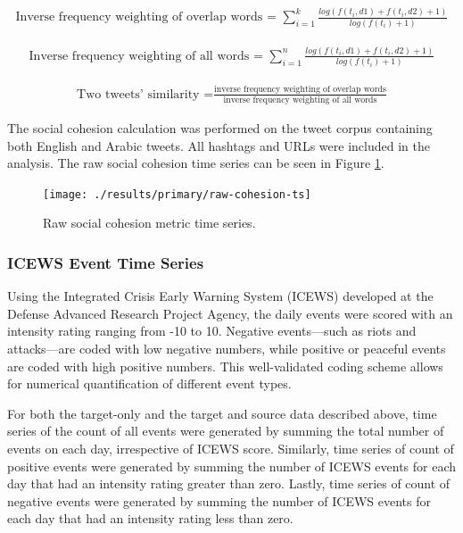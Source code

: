 \documentclass[
  english,
  man]{apa6}
\begin{document}
\begin{align}
\text{Inverse frequency weighting of overlap words = }\sum_{i=1}^k
\frac{log(f(t_i, d1) + f(t_i, d2) + 1)}{log(f(t_i) + 1)}
\end{align}

\begin{align}
\text{Inverse frequency weighting of all words = }\sum_{i=1}^n \frac{log(f(t_i,
d1) + f(t_i, d2) + 1)}{log(f(t_i) + 1)}
\end{align}

\begin{align}
\text{Two tweets' similarity =}\frac{\text{inverse frequency weighting of overlap
words}}{\text{inverse frequency weighting of all words}}
\end{align}

\noindent The social cohesion calculation was performed on the tweet corpus
containing both English and Arabic tweets. All hashtags and URLs were included
in the analysis. The raw social cohesion time series can be seen in Figure
\ref{fig:raw-cohesion-ts}.

\begin{figure}
\texttt{[image: ./results/primary/raw-cohesion-ts]} \caption{Raw social cohesion metric time series.}\label{fig:raw-cohesion-ts}
\end{figure}

\hypertarget{icews-event-time-series}{%
\subsubsection{ICEWS Event Time Series}\label{icews-event-time-series}}

Using the Integrated Crisis Early Warning System (ICEWS) developed at the
Defense Advanced Research Project Agency, the daily events were scored with an
intensity rating ranging from -10 to 10. Negative events---such as riots and
attacks---are coded with low negative numbers, while positive or peaceful events
are coded with high positive numbers. This well-validated coding scheme allows
for numerical quantification of different event types.

For both the target-only and the target and source data described above, time
series of the count of all events were generated by summing the total number of
events on each day, irrespective of ICEWS score. Similarly, time series of count
of positive events were generated by summing the number of ICEWS events for each
day that had an intensity rating greater than zero. Lastly, time series of count
of negative events were generated by summing the number of ICEWS events for each
day that had an intensity rating less than zero.
\end{document}
